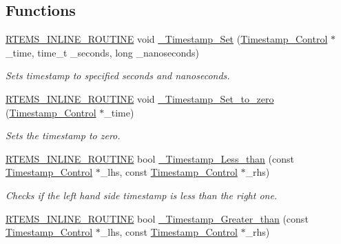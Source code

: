 \subsection*{Functions}
\begin{DoxyCompactItemize}
\item 
\mbox{\hyperlink{group__RTEMSScoreBaseDefs_gac216239df231d5dbd15e3520b0b9313f}{R\+T\+E\+M\+S\+\_\+\+I\+N\+L\+I\+N\+E\+\_\+\+R\+O\+U\+T\+I\+NE}} void \mbox{\hyperlink{group__SuperCoreTimeStamp_ga46e195298144d9defa8cad08207d3ce1}{\+\_\+\+Timestamp\+\_\+\+Set}} (\mbox{\hyperlink{group__SuperCoreTimeStamp_ga8508036506d5211c98844c88045e2410}{Timestamp\+\_\+\+Control}} $\ast$\+\_\+time, time\+\_\+t \+\_\+seconds, long \+\_\+nanoseconds)
\begin{DoxyCompactList}\small\item\em Sets timestamp to specified seconds and nanoseconds. \end{DoxyCompactList}\item 
\mbox{\hyperlink{group__RTEMSScoreBaseDefs_gac216239df231d5dbd15e3520b0b9313f}{R\+T\+E\+M\+S\+\_\+\+I\+N\+L\+I\+N\+E\+\_\+\+R\+O\+U\+T\+I\+NE}} void \mbox{\hyperlink{group__SuperCoreTimeStamp_ga6906837be670a2ca36c2f5a231034321}{\+\_\+\+Timestamp\+\_\+\+Set\+\_\+to\+\_\+zero}} (\mbox{\hyperlink{group__SuperCoreTimeStamp_ga8508036506d5211c98844c88045e2410}{Timestamp\+\_\+\+Control}} $\ast$\+\_\+time)
\begin{DoxyCompactList}\small\item\em Sets the timestamp to zero. \end{DoxyCompactList}\item 
\mbox{\hyperlink{group__RTEMSScoreBaseDefs_gac216239df231d5dbd15e3520b0b9313f}{R\+T\+E\+M\+S\+\_\+\+I\+N\+L\+I\+N\+E\+\_\+\+R\+O\+U\+T\+I\+NE}} bool \mbox{\hyperlink{group__SuperCoreTimeStamp_gabf40cb389eb452ee520043a6386b9c41}{\+\_\+\+Timestamp\+\_\+\+Less\+\_\+than}} (const \mbox{\hyperlink{group__SuperCoreTimeStamp_ga8508036506d5211c98844c88045e2410}{Timestamp\+\_\+\+Control}} $\ast$\+\_\+lhs, const \mbox{\hyperlink{group__SuperCoreTimeStamp_ga8508036506d5211c98844c88045e2410}{Timestamp\+\_\+\+Control}} $\ast$\+\_\+rhs)
\begin{DoxyCompactList}\small\item\em Checks if the left hand side timestamp is less than the right one. \end{DoxyCompactList}\item 
\mbox{\hyperlink{group__RTEMSScoreBaseDefs_gac216239df231d5dbd15e3520b0b9313f}{R\+T\+E\+M\+S\+\_\+\+I\+N\+L\+I\+N\+E\+\_\+\+R\+O\+U\+T\+I\+NE}} bool \mbox{\hyperlink{group__SuperCoreTimeStamp_ga4c13afe64fbb96455d7dc0ea3b9bd3f9}{\+\_\+\+Timestamp\+\_\+\+Greater\+\_\+than}} (const \mbox{\hyperlink{group__SuperCoreTimeStamp_ga8508036506d5211c98844c88045e2410}{Timestamp\+\_\+\+Control}} $\ast$\+\_\+lhs, const \mbox{\hyperlink{group__SuperCoreTimeStamp_ga8508036506d5211c98844c88045e2410}{Timestamp\+\_\+\+Control}} $\ast$\+\_\+rhs)

\end{DoxyCompactItemize}

